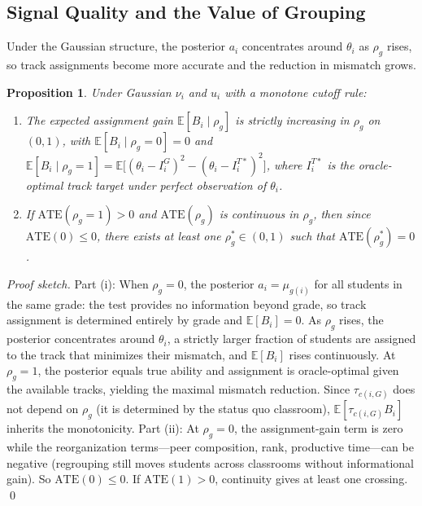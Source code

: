 \documentclass[11pt]{article}
\newtheorem{proposition}{Proposition}
\newcommand{\E}{\mathbb{E}}
\begin{document}
\subsection{Signal Quality and the Value of Grouping}

Under the Gaussian structure, the posterior $a_i$ concentrates around $\theta_i$ as $\rho_g$ rises, so track assignments become more accurate and the reduction in mismatch grows.

\begin{proposition}
\label{prop:threshold}
Under Gaussian $\nu_i$ and $u_i$ with a monotone cutoff rule:
\begin{enumerate}
\item[(i)] The expected assignment gain $\E[B_i \mid \rho_g]$ is strictly increasing in $\rho_g$ on $(0,1)$, with $\E[B_i \mid \rho_g = 0] = 0$ and $\E[B_i \mid \rho_g = 1] = \E\!\big[(\theta_i - I_i^G)^2 - (\theta_i - I_i^{T*})^2\big]$, where $I_i^{T*}$ is the oracle-optimal track target under perfect observation of $\theta_i$.
\item[(ii)] If $\text{ATE}(\rho_g = 1) > 0$ and $\text{ATE}(\rho_g)$ is continuous in $\rho_g$, then since $\text{ATE}(0) \leq 0$, there exists at least one $\rho^*_g \in (0,1)$ such that $\text{ATE}(\rho^*_g) = 0$.
\end{enumerate}
\end{proposition}

\noindent \emph{Proof sketch.} Part (i): When $\rho_g = 0$, the posterior $a_i = \mu_{g(i)}$ for all students in the same grade: the test provides no information beyond grade, so track assignment is determined entirely by grade and $\E[B_i] = 0$. As $\rho_g$ rises, the posterior concentrates around $\theta_i$, a strictly larger fraction of students are assigned to the track that minimizes their mismatch, and $\E[B_i]$ rises continuously. At $\rho_g = 1$, the posterior equals true ability and assignment is oracle-optimal given the available tracks, yielding the maximal mismatch reduction. Since $\tau_{c(i,G)}$ does not depend on $\rho_g$ (it is determined by the status quo classroom), $\E[\tau_{c(i,G)} B_i]$ inherits the monotonicity. Part (ii): At $\rho_g = 0$, the assignment-gain term is zero while the reorganization terms---peer composition, rank, productive time---can be negative (regrouping still moves students across classrooms without informational gain). So $\text{ATE}(0) \leq 0$. If $\text{ATE}(1) > 0$, continuity gives at least one crossing. \qed
\end{document}
